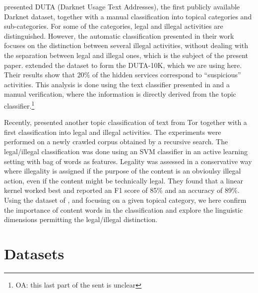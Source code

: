 \documentclass[11pt,a4paper,table]{article}
\newcommand{\oa}[1]{\footnote{\color{red}OA: #1}}
\begin{document}
\citet{AlNabki17} presented DUTA (Darknet Usage Text Addresses), the first publicly available Darknet dataset, together with a manual classification into topical categories and sub-categories. For some of the categories, legal and illegal activities are distinguished. However, the automatic classification presented in their work focuses on the distinction between several illegal activities, without dealing with the separation between legal and illegal ones, which is the subject of the present paper. \citet{AlNabki19} extended the dataset to form the DUTA-10K, which we are using here. Their results show that 20\% of the hidden services correspond to ``suspicious'' activities. This analysis is done using the text classifier presented in \citet{AlNabki17} and a manual verification, where the information is directly derived from the topic classifier.\oa{this last part of the sent is unclear}

Recently, \citet{Avarikioti18} presented another topic classification of text from Tor together with a first classification into legal and illegal activities.  The experiments were performed on a newly crawled corpus obtained by a recursive search. The legal/illegal classification was done using an SVM classifier in an active learning setting with bag of words as features. Legality was assessed in a conservative way where illegality is assigned if the purpose of the content is an obvioulsy illegal action, even if the content might be technically legal. They found that a linear kernel worked best and reported an F1 score of 85\% and an accuracy of 89\%. Using the dataset of \citet{AlNabki19}, and focusing on a given topical category, we here confirm the importance of content words in the classification and explore the linguistic dimensions permitting the legal/illegal distinction. 




\section{Datasets}\label{sec:data}\label{datasets}
\end{document}
